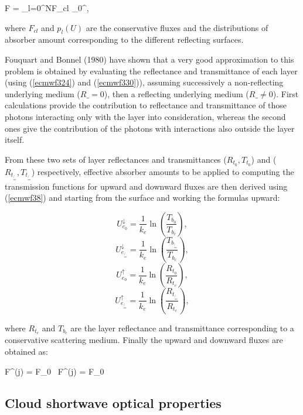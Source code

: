 \medskip
\be
F = \sum_{l=0}^N{F_{cl}} \int_0^{\infty},
\label{ecmwf331}
\ee
\medskip

\noindent where $F_{cl}$ and $p_l(U)$ are the conservative fluxes and the
distributions of absorber amount corresponding to the different reflecting
surfaces.

Fouquart and Bonnel (1980) have shown that a very good approximation to this
problem is obtained by evaluating the reflectance and transmittance of each
layer (using (\ref{ecmwf324}) and (\ref{ecmwf330})), assuming successively a
non-reflecting underlying medium ($R\_ = 0$), then a reflecting underlying
medium ($R\_ \ne 0$). First calculations provide the contribution to reflectance
and transmittance of those photons interacting only with the layer into
consideration, whereas the second ones give the contribution of the photons
with interactions also outside the layer itself.

From these two sets of layer reflectances and transmittances ($R_{t_0},T_{t_0}$)
and ($R_{t_{\not{=}}},T_{t_{\not{=}}}$) respectively, effective absorber amounts
to be applied to computing the transmission functions for upward and downward
fluxes are then derived using (\ref{ecmwf38}) and starting from the surface and
working the formulas upward:

\medskip
\[
U_{e_0}^{\!\downarrow} = \frac{1}{k_e} \ln(\frac{T_{b_0}}{T_{b_c}}),
\]
\[
U_{e_{\not{=}}}^{\!\downarrow} = \frac{1}{k_e} \ln(\frac{T_{b_{\not{=}}}}{T_{b_c}}),
\]
\be
\label{ecmwf332}
\ee
\[
U_{e_0}^{\!\uparrow} = \frac{1}{k_e} \ln(\frac{R_{t_0}}{R_{t_c}}),
\]
\[
U_{e_{\not{=}}}^{\!\uparrow} = \frac{1}{k_e} \ln(\frac{R_{t_{\not{=}}}}{R_{t_c}}),
\]
\medskip

\noindent where $R_{t_c}$ and $T_{b_c}$ are the layer reflectance and
transmittance corresponding to a conservative scattering medium.
Finally the upward and downward fluxes are obtained as:

\medskip
\be
F^{\!\uparrow}(j) = F_0 \, \biggl[R_{t_0} \, t_{\Delta\nu}(U_{e_0}^{\!\uparrow}) + (R_{t_{\not{=}}} - R_{t_0}) \, t_{\Delta\nu}U_{e_{\not{=}}}^{\!\uparrow})\biggr]
\label{ecmwf333a}
\ee
\medskip
\be
F^{\!\downarrow}(j) = F_0 \, \biggl[T_{b_0} \, t_{\Delta\nu}(U_{e_0}^{\!\downarrow}) + (T_{b_{\not{=}}} - T_{b_0}) \, t_{\Delta\nu}U_{e_{\not{=}}}^{\!\downarrow})\biggr]
\label{ecmwf333b}
\ee
\medskip

%
\subsection{Cloud shortwave optical properties}
%

